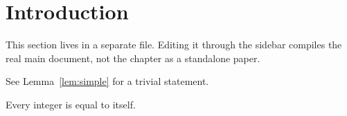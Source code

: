 \section{Introduction}

This section lives in a separate file. Editing it through the sidebar compiles
the real main document, not the chapter as a standalone paper.

See Lemma~\ref{lem:simple} for a trivial statement.

\begin{lemma}\label{lem:simple}
  Every integer is equal to itself.
\end{lemma}
